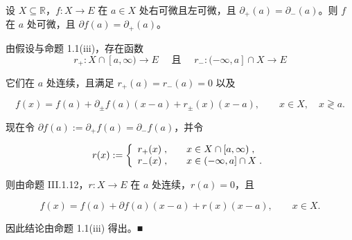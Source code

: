 \begin{proposition}

设 $ X \subseteq \mathbb{R} $，$ f: X \to E $ 在 $ a \in X $ 处右可微且左可微，且 $ \partial_+(a) = \partial_-(a) $。则 $ f $ 在 $ a $ 处可微，且 $ \partial f(a) = \partial_+(a) $。

\proofhead
由假设与命题 1.1(iii)，存在函数
\[
r_{+}:X\cap[a,\infty)\to E\quad\text{ 且 }\quad r_{-}:(-\infty,a]\cap X\to E
\]

它们在 $a$ 处连续，且满足 $ r_{+}(a)=r_{-}(a)=0 $ 以及

\[
f(x)=f(a)+\partial_{\pm}f(a)(x-a)+r_{\pm}(x)(x-a),\qquad x\in X,\quad x\gtrless a.
\]

现在令 $ \partial f(a) := \partial_{+} f(a) = \partial_{-} f(a) $，并令

\begin{equation*}
r(x):=\left\{\begin{array}{l l}{r_{+}(x)\;,\quad}&{x\in X\cap[a,\infty)\;,}\\ {r_{-}(x)\;,\quad}&{x\in(-\infty,a]\cap X\;.}\\ \end{array}\right.
\end{equation*}

则由命题 III.1.12，$ r: X \to E $ 在 $a$ 处连续，$ r(a) = 0 $，且

\[
f(x)=f(a)+\partial f(a)(x-a)+r(x)(x-a),\qquad x\in X.
\]

因此结论由命题 1.1(iii) 得出。■

\end{proposition}

